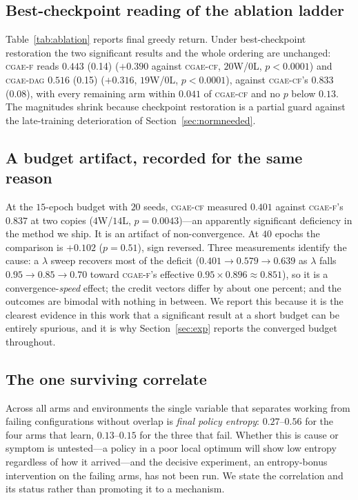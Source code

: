 \documentclass[review,authoryear,3p,times]{elsarticle}
\newcommand{\cflow}{\textsc{cgae-cf}}          %
\newcommand{\cflowraw}{\textsc{cgae-f}}        %
\newcommand{\cdag}{\textsc{cgae-dag}}          %
\begin{document}
\subsection{Best-checkpoint reading of the ablation ladder}

Table~\ref{tab:ablation} reports final greedy return. Under best-checkpoint
restoration the two significant results and the whole ordering are unchanged:
\cflowraw{} reads $0.443$ {\tiny(0.14)} ($+0.390$ against \cflow, $20$W/$0$L,
$p<0.0001$) and \cdag{} $0.516$ {\tiny(0.15)} ($+0.316$, $19$W/$0$L,
$p<0.0001$), against \cflow's $0.833$ {\tiny(0.08)}, with every remaining arm
within $0.041$ of \cflow{} and no $p$ below $0.13$. The magnitudes shrink
because checkpoint restoration is a partial guard against the late-training
deterioration of Section~\ref{sec:normneeded}.

\subsection{A budget artifact, recorded for the same reason}

At the $15$-epoch budget with $20$ seeds, \cflow{} measured $0.401$ against
\cflowraw's $0.837$ at two copies ($4$W/$14$L, $p=0.0043$)---an apparently
significant deficiency in the method we ship. It is an artifact of
non-convergence. At $40$ epochs the comparison is $+0.102$ ($p=0.51$), sign
reversed. Three measurements identify the cause: a $\lambda$ sweep recovers most
of the deficit ($0.401\to0.579\to0.639$ as $\lambda$ falls
$0.95\to0.85\to0.70$ toward \cflowraw's effective $0.95\times0.896\approx0.851$),
so it is a convergence-\emph{speed} effect; the credit vectors differ by about
one percent; and the outcomes are bimodal with nothing in between. We report
this because it is the clearest evidence in this work that a significant result
at a short budget can be entirely spurious, and it is why
Section~\ref{sec:exp} reports the converged budget throughout.

\subsection{The one surviving correlate}

Across all arms and environments the single variable that separates working from
failing configurations without overlap is \emph{final policy entropy}:
$0.27$--$0.56$ for the four arms that learn, $0.13$--$0.15$ for the three that
fail. Whether this is cause or symptom is untested---a policy in a poor local
optimum will show low entropy regardless of how it arrived---and the decisive
experiment, an entropy-bonus intervention on the failing arms, has not been run.
We state the correlation and its status rather than promoting it to a mechanism.
\end{document}
